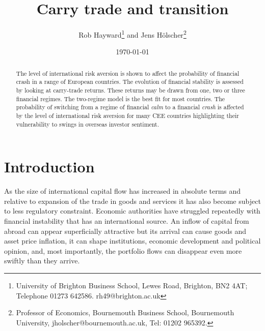 \documentclass[12pt, a4paper, oneside]{article} %
\begin{document}
\title{Carry trade and transition}
\author{Rob Hayward\footnote{University of Brighton Business School, Lewes Road, Brighton, BN2 4AT; Telephone 01273 642586.  rh49@brighton.ac.uk} and  Jens H\"{o}lscher\footnote{Professor of Economics, Bournemouth Business School, Bournemouth University, jholscher@bournemouth.ac.uk, Tel: 01202 965392.}} 
\date{\today}
\maketitle
\begin{abstract}
The level of international risk aversion is shown to affect the probability of financial crash in a range of European countries.  The evolution of financial stability is assessed by looking at carry-trade  returns.  These returns may be drawn from one, two or three financial regimes.  The two-regime model is the best fit for most countries.  The probability of switching from a regime of financial \emph{calm} to a financial \emph{crash} is affected by the level of international risk aversion for many CEE countries highlighting their vulnerability to swings in overseas investor sentiment.    
\end{abstract}

\section{Introduction}
As the size of international capital flow has increased in absolute terms and relative to expansion of the trade in goods and services it has also become subject to less regulatory constraint. Economic authorities have struggled repeatedly with financial instability that has an international source.  An inflow of capital from abroad can appear superficially attractive but its arrival can cause goods and asset price inflation, it can shape institutions, economic development and political opinion, and, most importantly, the portfolio flows can disappear even more swiftly than they arrive.  %
\end{document}
